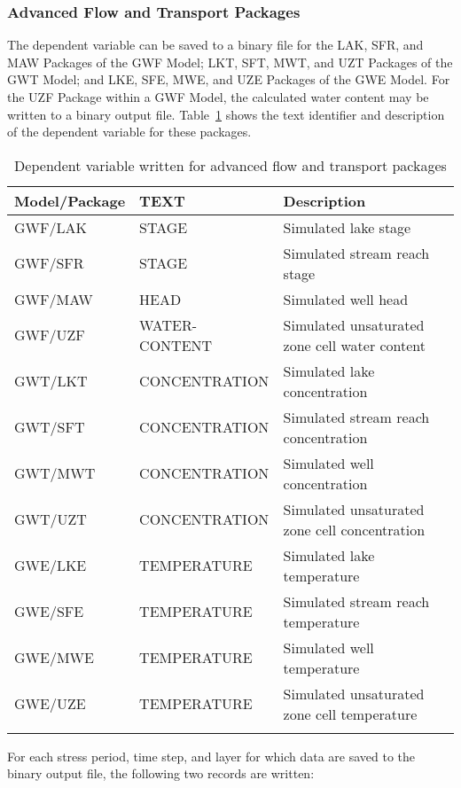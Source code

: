 \newpage
\subsubsection{Advanced Flow and Transport Packages}

\vspace{5mm}
The dependent variable can be saved to a binary file for the LAK, SFR, and MAW Packages of the GWF Model; LKT, SFT, MWT, and UZT Packages of the GWT Model; and LKE, SFE, MWE, and UZE Packages of the GWE Model.  For the UZF Package within a GWF Model, the calculated water content may be written to a binary output file. Table~\ref{table:adpdv} shows the text identifier and description of the dependent variable for these packages.

\begin{longtable}{p{3cm} p{3.5 cm} p{5cm}}
\caption{Dependent variable written for advanced flow and transport packages} 
\tabularnewline
\hline
\textbf{Model/Package} & \textbf{TEXT} & \textbf{Description}  \\
\hline
\endhead
\hline
\endfoot
GWF/LAK & STAGE & Simulated lake stage  \\
GWF/SFR & STAGE & Simulated stream reach stage  \\
GWF/MAW & HEAD & Simulated well head  \\
GWF/UZF & WATER-CONTENT & Simulated unsaturated zone cell water content \\
GWT/LKT & CONCENTRATION & Simulated lake concentration  \\
GWT/SFT & CONCENTRATION & Simulated stream reach concentration  \\
GWT/MWT & CONCENTRATION & Simulated well concentration  \\
GWT/UZT & CONCENTRATION & Simulated unsaturated zone cell concentration  \\
GWE/LKE & TEMPERATURE & Simulated lake temperature  \\
GWE/SFE & TEMPERATURE & Simulated stream reach temperature  \\
GWE/MWE & TEMPERATURE & Simulated well temperature  \\
GWE/UZE & TEMPERATURE & Simulated unsaturated zone cell temperature  \\
\label{table:adpdv}
\end{longtable}



For each stress period, time step, and layer for which data are saved to the binary output file, the following two records are written:

